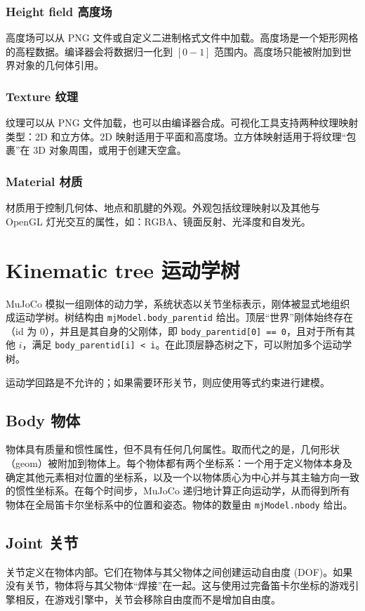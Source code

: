 \subsubsection{Height field 高度场}
高度场可以从 PNG 文件或自定义二进制格式文件中加载。高度场是一个矩形网格的高程数据。编译器会将数据归一化到 $[0-1]$ 范围内。高度场只能被附加到世界对象的几何体引用。

\subsubsection{Texture 纹理}
纹理可以从 PNG 文件加载，也可以由编译器合成。可视化工具支持两种纹理映射类型：2D 和立方体。2D 映射适用于平面和高度场。立方体映射适用于将纹理“包裹”在 3D 对象周围，或用于创建天空盒。

\subsubsection{Material 材质}
材质用于控制几何体、地点和肌腱的外观。外观包括纹理映射以及其他与 OpenGL 灯光交互的属性，如：RGBA、镜面反射、光泽度和自发光。

\section{Kinematic tree 运动学树}
MuJoCo 模拟一组刚体的动力学，系统状态以关节坐标表示，刚体被显式地组织成运动学树。树结构由 \texttt{mjModel.body\_parentid} 给出。顶层“世界”刚体始终存在（id 为 $0$），并且是其自身的父刚体，即 \texttt{body\_parentid[0] == 0}，且对于所有其他 $i$，满足 \texttt{body\_parentid[i] < i}。在此顶层静态树之下，可以附加多个运动学树。

运动学回路是不允许的；如果需要环形关节，则应使用等式约束进行建模。

\subsection{Body 物体}
物体具有质量和惯性属性，但不具有任何几何属性。取而代之的是，几何形状（geom）被附加到物体上。每个物体都有两个坐标系：一个用于定义物体本身及确定其他元素相对位置的坐标系，以及一个以物体质心为中心并与其主轴方向一致的惯性坐标系。在每个时间步，MuJoCo 递归地计算正向运动学，从而得到所有物体在全局笛卡尔坐标系中的位置和姿态。物体的数量由 \texttt{mjModel.nbody} 给出。
\subsection{Joint 关节}
关节定义在物体内部。它们在物体与其父物体之间创建运动自由度 (DOF)。如果没有关节，物体将与其父物体“焊接”在一起。这与使用过完备笛卡尔坐标的游戏引擎相反，在游戏引擎中，关节会移除自由度而不是增加自由度。

